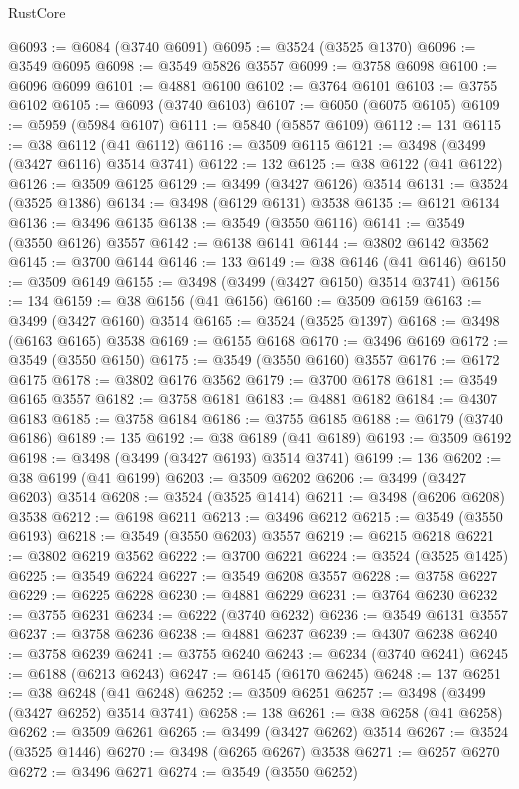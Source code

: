 \begin{lexlean}{RustCore}
\begin{coremodule}
@6093 := @6084 (@3740 @6091)
@6095 := @3524 (@3525 @1370)
@6096 := @3549 @6095
@6098 := @3549 @5826 @3557
@6099 := @3758 @6098
@6100 := @6096 @6099
@6101 := @4881 @6100
@6102 := @3764 @6101
@6103 := @3755 @6102
@6105 := @6093 (@3740 @6103)
@6107 := @6050 (@6075 @6105)
@6109 := @5959 (@5984 @6107)
@6111 := @5840 (@5857 @6109)
@6112 := 131
@6115 := @38 @6112 (@41 @6112)
@6116 := @3509 @6115
@6121 := @3498 (@3499 (@3427 @6116) @3514 @3741)
@6122 := 132
@6125 := @38 @6122 (@41 @6122)
@6126 := @3509 @6125
@6129 := @3499 (@3427 @6126) @3514
@6131 := @3524 (@3525 @1386)
@6134 := @3498 (@6129 @6131) @3538
@6135 := @6121 @6134
@6136 := @3496 @6135
@6138 := @3549 (@3550 @6116)
@6141 := @3549 (@3550 @6126) @3557
@6142 := @6138 @6141
@6144 := @3802 @6142 @3562
@6145 := @3700 @6144
@6146 := 133
@6149 := @38 @6146 (@41 @6146)
@6150 := @3509 @6149
@6155 := @3498 (@3499 (@3427 @6150) @3514 @3741)
@6156 := 134
@6159 := @38 @6156 (@41 @6156)
@6160 := @3509 @6159
@6163 := @3499 (@3427 @6160) @3514
@6165 := @3524 (@3525 @1397)
@6168 := @3498 (@6163 @6165) @3538
@6169 := @6155 @6168
@6170 := @3496 @6169
@6172 := @3549 (@3550 @6150)
@6175 := @3549 (@3550 @6160) @3557
@6176 := @6172 @6175
@6178 := @3802 @6176 @3562
@6179 := @3700 @6178
@6181 := @3549 @6165 @3557
@6182 := @3758 @6181
@6183 := @4881 @6182
@6184 := @4307 @6183
@6185 := @3758 @6184
@6186 := @3755 @6185
@6188 := @6179 (@3740 @6186)
@6189 := 135
@6192 := @38 @6189 (@41 @6189)
@6193 := @3509 @6192
@6198 := @3498 (@3499 (@3427 @6193) @3514 @3741)
@6199 := 136
@6202 := @38 @6199 (@41 @6199)
@6203 := @3509 @6202
@6206 := @3499 (@3427 @6203) @3514
@6208 := @3524 (@3525 @1414)
@6211 := @3498 (@6206 @6208) @3538
@6212 := @6198 @6211
@6213 := @3496 @6212
@6215 := @3549 (@3550 @6193)
@6218 := @3549 (@3550 @6203) @3557
@6219 := @6215 @6218
@6221 := @3802 @6219 @3562
@6222 := @3700 @6221
@6224 := @3524 (@3525 @1425)
@6225 := @3549 @6224
@6227 := @3549 @6208 @3557
@6228 := @3758 @6227
@6229 := @6225 @6228
@6230 := @4881 @6229
@6231 := @3764 @6230
@6232 := @3755 @6231
@6234 := @6222 (@3740 @6232)
@6236 := @3549 @6131 @3557
@6237 := @3758 @6236
@6238 := @4881 @6237
@6239 := @4307 @6238
@6240 := @3758 @6239
@6241 := @3755 @6240
@6243 := @6234 (@3740 @6241)
@6245 := @6188 (@6213 @6243)
@6247 := @6145 (@6170 @6245)
@6248 := 137
@6251 := @38 @6248 (@41 @6248)
@6252 := @3509 @6251
@6257 := @3498 (@3499 (@3427 @6252) @3514 @3741)
@6258 := 138
@6261 := @38 @6258 (@41 @6258)
@6262 := @3509 @6261
@6265 := @3499 (@3427 @6262) @3514
@6267 := @3524 (@3525 @1446)
@6270 := @3498 (@6265 @6267) @3538
@6271 := @6257 @6270
@6272 := @3496 @6271
@6274 := @3549 (@3550 @6252)

\end{coremodule}
\end{lexlean}

